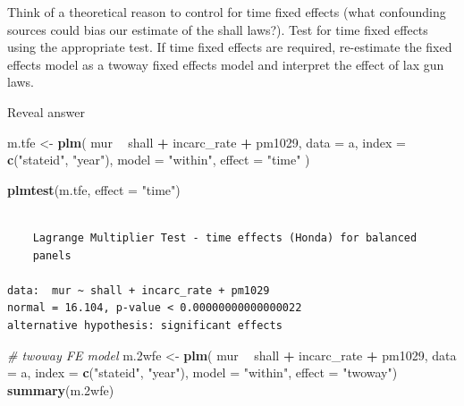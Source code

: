\documentclass[]{article}
\newenvironment{Shaded}{\begin{snugshade}}{\end{snugshade}}
\newcommand{\KeywordTok}[1]{\textcolor[rgb]{0.13,0.29,0.53}{\textbf{#1}}}
\newcommand{\DataTypeTok}[1]{\textcolor[rgb]{0.13,0.29,0.53}{#1}}
\newcommand{\StringTok}[1]{\textcolor[rgb]{0.31,0.60,0.02}{#1}}
\newcommand{\CommentTok}[1]{\textcolor[rgb]{0.56,0.35,0.01}{\textit{#1}}}
\newcommand{\OperatorTok}[1]{\textcolor[rgb]{0.81,0.36,0.00}{\textbf{#1}}}
\newcommand{\NormalTok}[1]{#1}
\theoremstyle{definition}
\theoremstyle{definition}
\theoremstyle{definition}
\theoremstyle{remark}
\begin{document}
Think of a theoretical reason to control for time fixed effects (what
confounding sources could bias our estimate of the shall laws?). Test
for time fixed effects using the appropriate test. If time fixed effects
are required, re-estimate the fixed effects model as a twoway fixed
effects model and interpret the effect of lax gun laws.

 Reveal answer

\begin{Shaded}
\begin{Highlighting}[]
\NormalTok{m.tfe <-}\StringTok{ }\KeywordTok{plm}\NormalTok{(}
\NormalTok{  mur }\OperatorTok{~}\StringTok{ }\NormalTok{shall }\OperatorTok{+}\StringTok{ }\NormalTok{incarc_rate }\OperatorTok{+}\StringTok{ }\NormalTok{pm1029,}
  \DataTypeTok{data =}\NormalTok{ a,}
  \DataTypeTok{index =} \KeywordTok{c}\NormalTok{(}\StringTok{"stateid"}\NormalTok{, }\StringTok{"year"}\NormalTok{),}
  \DataTypeTok{model =} \StringTok{"within"}\NormalTok{,}
  \DataTypeTok{effect =} \StringTok{"time"}
\NormalTok{  )}

\KeywordTok{plmtest}\NormalTok{(m.tfe, }\DataTypeTok{effect =} \StringTok{"time"}\NormalTok{)}
\end{Highlighting}
\end{Shaded}

\begin{verbatim}

    Lagrange Multiplier Test - time effects (Honda) for balanced
    panels

data:  mur ~ shall + incarc_rate + pm1029
normal = 16.104, p-value < 0.00000000000000022
alternative hypothesis: significant effects
\end{verbatim}

\begin{Shaded}
\begin{Highlighting}[]
\CommentTok{# twoway FE model}
\NormalTok{m.2wfe <-}\StringTok{ }\KeywordTok{plm}\NormalTok{(}
\NormalTok{  mur }\OperatorTok{~}\StringTok{ }\NormalTok{shall }\OperatorTok{+}\StringTok{ }\NormalTok{incarc_rate }\OperatorTok{+}\StringTok{ }\NormalTok{pm1029,}
  \DataTypeTok{data =}\NormalTok{ a,}
  \DataTypeTok{index =} \KeywordTok{c}\NormalTok{(}\StringTok{"stateid"}\NormalTok{, }\StringTok{"year"}\NormalTok{),}
  \DataTypeTok{model =} \StringTok{"within"}\NormalTok{,}
  \DataTypeTok{effect =} \StringTok{"twoway"}\NormalTok{)}
\KeywordTok{summary}\NormalTok{(m.2wfe)}
\end{Highlighting}
\end{Shaded}
\end{document}
